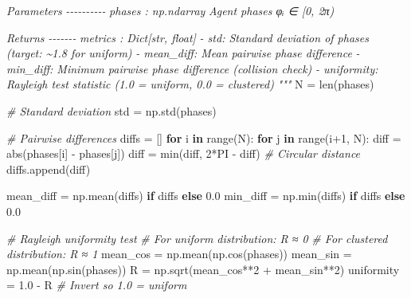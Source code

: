 \documentclass[
]{article}
\newenvironment{Shaded}{}{}
\newcommand{\BuiltInTok}[1]{\textcolor[rgb]{0.00,0.50,0.00}{#1}}
\newcommand{\CommentTok}[1]{\textcolor[rgb]{0.38,0.63,0.69}{\textit{#1}}}
\newcommand{\ControlFlowTok}[1]{\textcolor[rgb]{0.00,0.44,0.13}{\textbf{#1}}}
\newcommand{\DecValTok}[1]{\textcolor[rgb]{0.25,0.63,0.44}{#1}}
\newcommand{\FloatTok}[1]{\textcolor[rgb]{0.25,0.63,0.44}{#1}}
\newcommand{\KeywordTok}[1]{\textcolor[rgb]{0.00,0.44,0.13}{\textbf{#1}}}
\newcommand{\NormalTok}[1]{#1}
\newcommand{\OperatorTok}[1]{\textcolor[rgb]{0.40,0.40,0.40}{#1}}
\begin{document}
\begin{Shaded}
\begin{Highlighting}[]
\CommentTok{    Parameters}
\CommentTok{    {-}{-}{-}{-}{-}{-}{-}{-}{-}{-}}
\CommentTok{    phases : np.ndarray}
\CommentTok{        Agent phases φᵢ ∈ [0, 2π)}

\CommentTok{    Returns}
\CommentTok{    {-}{-}{-}{-}{-}{-}{-}}
\CommentTok{    metrics : Dict[str, float]}
\CommentTok{        {-} std: Standard deviation of phases (target: \textasciitilde{}1.8 for uniform)}
\CommentTok{        {-} mean\_diff: Mean pairwise phase difference}
\CommentTok{        {-} min\_diff: Minimum pairwise phase difference (collision check)}
\CommentTok{        {-} uniformity: Rayleigh test statistic (1.0 = uniform, 0.0 = clustered)}
\CommentTok{    """}
\NormalTok{    N }\OperatorTok{=} \BuiltInTok{len}\NormalTok{(phases)}

    \CommentTok{\# Standard deviation}
\NormalTok{    std }\OperatorTok{=}\NormalTok{ np.std(phases)}

    \CommentTok{\# Pairwise differences}
\NormalTok{    diffs }\OperatorTok{=}\NormalTok{ []}
    \ControlFlowTok{for}\NormalTok{ i }\KeywordTok{in} \BuiltInTok{range}\NormalTok{(N):}
        \ControlFlowTok{for}\NormalTok{ j }\KeywordTok{in} \BuiltInTok{range}\NormalTok{(i}\OperatorTok{+}\DecValTok{1}\NormalTok{, N):}
\NormalTok{            diff }\OperatorTok{=} \BuiltInTok{abs}\NormalTok{(phases[i] }\OperatorTok{{-}}\NormalTok{ phases[j])}
\NormalTok{            diff }\OperatorTok{=} \BuiltInTok{min}\NormalTok{(diff, }\DecValTok{2}\OperatorTok{*}\NormalTok{PI }\OperatorTok{{-}}\NormalTok{ diff)  }\CommentTok{\# Circular distance}
\NormalTok{            diffs.append(diff)}

\NormalTok{    mean\_diff }\OperatorTok{=}\NormalTok{ np.mean(diffs) }\ControlFlowTok{if}\NormalTok{ diffs }\ControlFlowTok{else} \FloatTok{0.0}
\NormalTok{    min\_diff }\OperatorTok{=}\NormalTok{ np.}\BuiltInTok{min}\NormalTok{(diffs) }\ControlFlowTok{if}\NormalTok{ diffs }\ControlFlowTok{else} \FloatTok{0.0}

    \CommentTok{\# Rayleigh uniformity test}
    \CommentTok{\# For uniform distribution: R ≈ 0}
    \CommentTok{\# For clustered distribution: R ≈ 1}
\NormalTok{    mean\_cos }\OperatorTok{=}\NormalTok{ np.mean(np.cos(phases))}
\NormalTok{    mean\_sin }\OperatorTok{=}\NormalTok{ np.mean(np.sin(phases))}
\NormalTok{    R }\OperatorTok{=}\NormalTok{ np.sqrt(mean\_cos}\OperatorTok{**}\DecValTok{2} \OperatorTok{+}\NormalTok{ mean\_sin}\OperatorTok{**}\DecValTok{2}\NormalTok{)}
\NormalTok{    uniformity }\OperatorTok{=} \FloatTok{1.0} \OperatorTok{{-}}\NormalTok{ R  }\CommentTok{\# Invert so 1.0 = uniform}


\end{Highlighting}
\end{Shaded}
\end{document}
